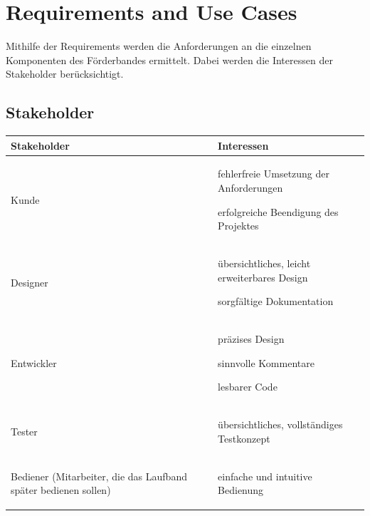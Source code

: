 \documentclass[a4paper, 11pt]{article}
\begin{document}
\newpage

\section{Requirements and Use Cases}
Mithilfe der Requirements werden die Anforderungen an die einzelnen Komponenten des Förderbandes ermittelt. Dabei werden die Interessen der Stakeholder berücksichtigt.
\subsection{Stakeholder}
\begin{table}[H]
\centering
    \begin{tabularx}{\textwidth}{|X|X|}
    \hline
    \textbf{Stakeholder}&\textbf{Interessen}\\
    \hline
    Kunde&\begin{compactenum}[-]
        \item fehlerfreie Umsetzung der Anforderungen
        \item erfolgreiche Beendigung des Projektes 
    \end{compactenum}\\
    \hline
    Designer&\begin{compactenum}[-]
        \item übersichtliches, leicht erweiterbares Design
        \item sorgfältige Dokumentation 
    \end{compactenum}\\ 
    \hline
    Entwickler&\begin{compactenum}[-]
        \item präzises Design
        \item sinnvolle Kommentare
        \item lesbarer Code 
    \end{compactenum}\\
    \hline
    Tester&\begin{compactenum}[-]
        \item übersichtliches, vollständiges Testkonzept 
    \end{compactenum}\\
    \hline
    Bediener (Mitarbeiter, die das Laufband später bedienen sollen)&\begin{compactenum}[-]
        \item einfache und intuitive Bedienung
    \end{compactenum}\\

\end{tabularx}
\end{table}
\end{document}
